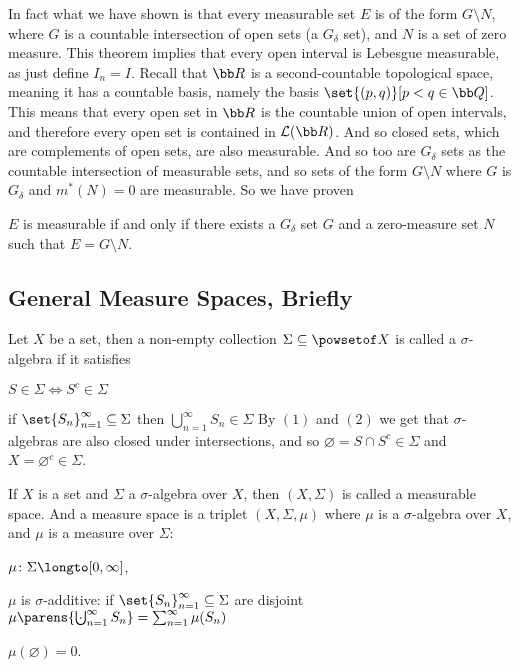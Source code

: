 In fact what we have shown is that every measurable set $E$ is of the form $G\setminus N$, where $G$ is a countable intersection of open sets (a $G_\delta$ set), and $N$ is a set of zero measure.
This theorem implies that every open interval is Lebesgue measurable, as just define $I_n=I$.
Recall that ${\bb R}$ is a second-countable topological space, meaning it has a countable basis, namely the basis $\set{(p,q)}[p<q\in{\bb Q}]$.
This means that every open set in ${\bb R}$ is the countable union of open intervals, and therefore every open set is contained in ${\cal L}({\bb R})$.
And so closed sets, which are complements of open sets, are also measurable.
And so too are $G_\delta$ sets as the countable intersection of measurable sets, and so sets of the form $G\setminus N$ where $G$ is $G_\delta$ and $m^*(N)=0$ are measurable.
So we have proven

\bprop

    $E$ is measurable if and only if there exists a $G_\delta$ set $G$ and a zero-measure set $N$ such that $E=G\setminus N$.

\eprop

\subsection{General Measure Spaces, Briefly}

\bdefn

    Let $X$ be a set, then a non-empty collection $\Sigma\subseteq\powsetof X$ is called a {\emphcolor $\sigma$-algebra} if it satisfies
    \benum
        \item $S\in\Sigma\iff S^c\in\Sigma$
        \item if $\set{S_n}_{n=1}^\infty\subseteq\Sigma$ then $\bigcup_{n=1}^\infty S_n\in\Sigma$
    \eenum
    By $(1)$ and $(2)$ we get that $\sigma$-algebras are also closed under intersections, and so $\varnothing=S\cap S^c\in\Sigma$ and $X=\varnothing^c\in\Sigma$.

    If $X$ is a set and $\Sigma$ a $\sigma$-algebra over $X$, then $(X,\Sigma)$ is called a {\emphcolor measurable space}.
    And a {\emphcolor measure space} is a triplet $(X,\Sigma,\mu)$ where $\mu$ is a $\sigma$-algebra over $X$, and $\mu$ is a {\emphcolor measure} over $\Sigma$:
    \benum
        \item $\mu\colon\Sigma\longto[0,\infty]$,
        \item $\mu$ is $\sigma$-additive: if $\set{S_n}_{n=1}^\infty\subseteq\Sigma$ are disjoint $\mu\parens{\bigdcup_{n=1}^\infty S_n}=\sum_{n=1}^\infty\mu(S_n)$
        \item $\mu(\varnothing)=0$.
    \eenum

